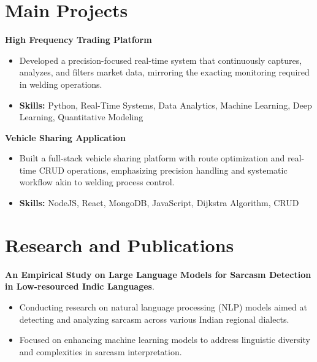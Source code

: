 \documentclass[a4paper,11pt]{article}
\begin{document}
\section{\textbf{Main Projects}}

\vspace{1mm}
  \textbf{High Frequency Trading Platform  }
\vspace{-1.5mm} %
\begin{itemize}
  \item Developed a precision-focused real-time system that continuously captures, analyzes, and filters market data, mirroring the exacting monitoring required in welding operations.
\vspace{-3mm}
  \item \textbf{Skills:} Python, Real-Time Systems, Data Analytics, Machine Learning, Deep Learning, Quantitative Modeling
\end{itemize}


\vspace{1mm}
   \textbf{Vehicle Sharing Application }
\vspace{-1.5mm} %
\begin{itemize}
  \item Built a full-stack vehicle sharing platform with route optimization and real-time CRUD operations, emphasizing precision handling and systematic workflow akin to welding process control.
\vspace{-3mm}
  \item \textbf{Skills:} NodeJS, React, MongoDB, JavaScript, Dijkstra Algorithm, CRUD
\end{itemize}



\section{\textbf{Research and Publications} \hfill }
\vspace{1mm}
  \textbf{An Empirical Study on Large Language Models for Sarcasm Detection in Low-resourced Indic Languages}.
\vspace{-1mm} %
\begin{itemize}
  \item Conducting research on natural language processing (NLP) models aimed at detecting and analyzing sarcasm across various Indian regional dialects.
\vspace{-3mm}
  \item Focused on enhancing machine learning models to address linguistic diversity and complexities in sarcasm interpretation.
\end{itemize}
\end{document}

